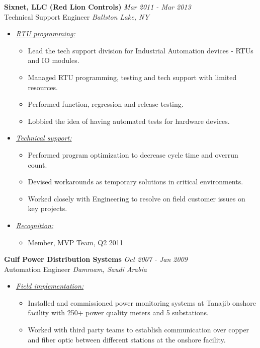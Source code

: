 \documentclass{article}
\begin{document}
    {\bf Sixnet, LLC (Red Lion Controls)} \hfill {\em Mar 2011 - Mar 2013} \\
    Technical Support Engineer \hfill {\em Ballston Lake, NY} \\
    \begin{itemize}
    \item \underline{\it RTU programming:}
          \begin{itemize}
          \item Lead the tech support division for Industrial Automation
                devices - RTUs and IO modules.
          \item Managed RTU programming, testing and tech support with limited
                resources.
          \item Performed function, regression and release testing.
          \item Lobbied the idea of having automated tests for hardware devices.
          \end{itemize}
    \item \underline{\it Technical support:}
          \begin{itemize}
          \item Performed program optimization to decrease cycle time and
                overrun count.
          \item Devised workarounds as temporary solutions in critical
                environments.
          \item Worked closely with Engineering to resolve on field customer
                issues on key projects.
          \end{itemize}
    \item \underline{\it Recognition:}
          \begin{itemize}
          \item Member, MVP Team, Q2 2011
          \end{itemize}
    \end{itemize}
    \bigskip

    {\bf Gulf Power Distribution Systems} \hfill {\em Oct 2007 - Jan 2009} \\
    Automation Engineer \hfill {\em Dammam, Saudi Arabia} \\
    \begin{itemize}
    \item \underline{\it Field implementation:}
          \begin{itemize}
          \item Installed and commissioned power monitoring systems at Tanajib
                onshore facility with 250+ power quality meters and 5
                substations.
          \item Worked with third party teams to establish communication over
                copper and fiber optic between different stations at the onshore
                facility.
          \end{itemize}
    \end{itemize}
    \bigskip
\end{document}

